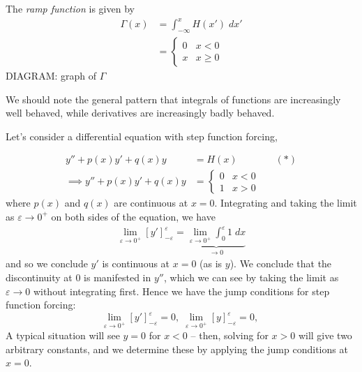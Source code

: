 \documentclass{../../template/note}
\begin{document}

    \begin{definition}
        The \emph{ramp function} is given by
        \begin{align*}
            \Gamma(x) &= \int_{-\infty}^x H(x') \; dx' \\
            &= \begin{cases}
                0 & x < 0 \\
                x & x \geq 0
            \end{cases}
        \end{align*}
        DIAGRAM: graph of \(\Gamma\)
    \end{definition}
    
    \begin{remark*}
        We should note the general pattern that integrals of functions are increasingly well behaved, while derivatives are increasingly badly behaved.
    \end{remark*}
    
    Let's consider a differential equation with step function forcing,

    \begin{align*}
        y'' + p(x)y' + q(x)y &= H(x) && (*) \\
        \implies y'' + p(x)y' + q(x)y &= \begin{cases}
            0 & x < 0 \\
            1 & x > 0
        \end{cases}
    \end{align*}
    where \(p(x)\) and \(q(x)\) are continuous at \(x=0\). Integrating and taking the limit as \(\varepsilon \to 0^+\) on both sides of the equation, we have
    \begin{align*}
        \lim_{\varepsilon \to 0^+} [y']_{-\varepsilon}^\varepsilon = \underbrace{\lim_{\varepsilon \to 0^+} \int_0^\varepsilon 1 \; dx}_{\to 0}
    \end{align*}
    and so we conclude \(y'\) is continuous at \(x=0\) (as is \(y\)). We conclude that the discontinuity at 0 is manifested in \(y''\), which we can see by taking the limit as \(\varepsilon \to 0\) without integrating first. Hence we have the jump conditions for step function forcing:
    \[
        \lim_{\varepsilon \to 0^+} [y']_{-\varepsilon}^\varepsilon = 0, \; 
        \lim_{\varepsilon \to 0^+} [y]_{-\varepsilon}^\varepsilon = 0, \; 
    \]
    A typical situation will see \(y=0\) for \(x < 0\) -- then, solving for \(x>0\) will give two arbitrary constants, and we determine these by applying the jump conditions at \(x = 0\).
\end{document}
